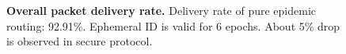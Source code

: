 \documentclass[11pt]{article}
\begin{document}
\begin{figure}[h!]
\center
{}
\hfill
{}

\caption{{\bf Overall packet delivery rate.} 
Delivery rate of pure epidemic routing: 92.91\%.  
Ephemeral ID is valid for 6 epochs. 
About 5\% drop is observed in secure protocol.
}
\label{fig:delivery_rate}
\end{figure}
\end{document}
